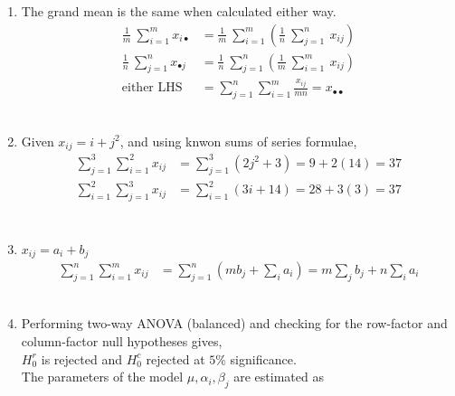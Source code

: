 \begin{enumerate}
\begin{table}[H]
		\bigskip
	\end{table}
	
	\item The grand mean is the same when calculated either way.\\
	
	\begin{align}
		\frac{1}{m}\ \sum\limits_{i = 1}^{m} x_{i\bullet} &= \frac{1}{m}\ \sum\limits_{i = 1}^{m} \left( \frac{1}{n}\ \sum\limits_{j = 1}^{n}\ x_{ij} \right) \nonumber \\
		\frac{1}{n}\ \sum\limits_{j = 1}^{n} x_{\bullet j} &= \frac{1}{n}\ \sum\limits_{j = 1}^{n} \left( \frac{1}{m}\ \sum\limits_{i = 1}^{m}\ x_{ij} \right) \nonumber \\
		\text{either LHS } &= \sum\limits_{j = 1}^{n} \sum\limits_{i = 1}^{m} \frac{x_{ij}}{mn} = x_{\bullet \bullet}
	\end{align}\\

	\item Given $ x_{ij} = i + j^2 $, and using knwon sums of series formulae,\\

		\begin{align}
			\sum\limits_{j = 1}^{3} \sum\limits_{i = 1}^{2} x_{ij} &= \sum\limits_{j = 1}^{3} (2j^2 + 3) = 9 + 2(14) = 37 \nonumber \\
			\sum\limits_{i = 1}^{2} \sum\limits_{j = 1}^{3} x_{ij} &= \sum\limits_{i = 1}^{2} (3i + 14) = 28 + 3(3) = 37 \nonumber \\
		\end{align}\\
	
	\item $ x_{ij} = a_i + b_j $\\
	
	\begin{align}
		\sum\limits_{j = 1}^{n} \sum\limits_{i = 1}^{m} x_{ij} &= \sum\limits_{j = 1}^{n} (m b_j + \sum_i a_i) = m \sum_j b_j + n \sum_i a_i 
	\end{align}\\

	\item Performing two-way ANOVA (balanced) and checking for the row-factor and column-factor null hypotheses gives,\\
	$ H_0^r $ is rejected and $ H_0^c $ rejected at $ 5\% $ significance.\\

	The parameters of the model $ \mu, \alpha_i, \beta_j $ are estimated as\\
	

\end{enumerate}
